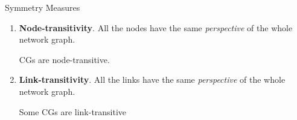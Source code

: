 \begin{frame}[t]{Symmetry Measures}
\begin{enumerate}
\item \textbf{Node-transitivity}. All the nodes have the same \textit{perspective} of the whole network graph. 

CGs are node-transitive.
\item \textbf{Link-transitivity}. All the links have the same \textit{perspective} of the whole network graph. 

Some CGs are link-transitive
\end{enumerate}
\scriptsize
{}
\end{frame}
